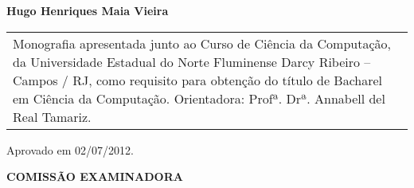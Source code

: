 \begin{folhadeaprovacao}
  \thispagestyle{empty}
  \center
  \textbf{Hugo Henriques Maia Vieira}
  \vfill

  \center{\textbf{\Large{\textit{\meutitulo}}}}

  \hspace*{2cm}
  \begin{table}[h!]
    \raggedleft
    \begin{tabular}{p{7cm}}
    Monografia apresentada junto ao Curso de Ciência da Computação, da Universidade Estadual do Norte Fluminense Darcy Ribeiro – Campos / RJ, como requisito para obtenção do título de Bacharel em Ciência da Computação.
    Orientadora: Profª. Drª. Annabell del Real Tamariz.
    \end{tabular}
  \end{table}

  \hspace*{2cm}
  \raggedright Aprovado em 02/07/2012.

  \center
  \textbf{COMISSÃO EXAMINADORA}

  \setlength{\ABNTsignthickness}{0.4pt} \setlength{\ABNTsignskip}{2cm}

\end{folhadeaprovacao}